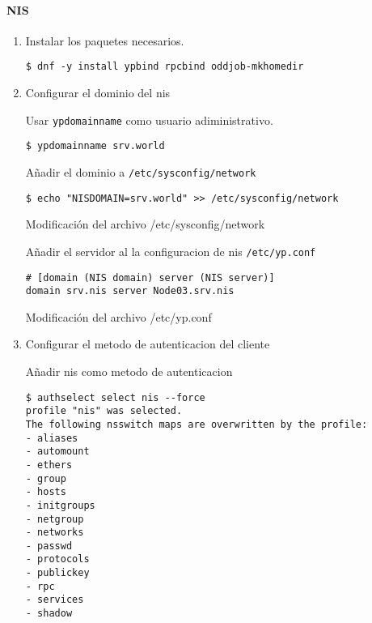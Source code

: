 \documentclass[../main.tex]{subfiles}
\begin{document}
\paragraph{NIS}
\begin{enumerate}
  \item Instalar los paquetes necesarios.
        \begin{listing}[H]
\begin{verbatim}
$ dnf -y install ypbind rpcbind oddjob-mkhomedir
\end{verbatim}
        \end{listing}

  \item Configurar el dominio del \acrshort{nis}

        Usar \texttt{ypdomainname} como usuario adiministrativo.
        \begin{listing}[H]
\begin{verbatim}
$ ypdomainname srv.world
\end{verbatim}
        \end{listing}
        Añadir el dominio a \texttt{/etc/sysconfig/network}
        \begin{listing}[H]
\begin{verbatim}
$ echo "NISDOMAIN=srv.world" >> /etc/sysconfig/network
\end{verbatim}
          \label{list:sysnetwork}
          \caption{Modificación del archivo /etc/sysconfig/network}
        \end{listing}
        Añadir el servidor al la configuracion de \acrshort{nis} \texttt{/etc/yp.conf}
        \begin{listing}[H]
\begin{verbatim}
# [domain (NIS domain) server (NIS server)]
domain srv.nis server Node03.srv.nis
\end{verbatim}
          \label{list:yp}
          \caption{Modificación del archivo /etc/yp.conf}
        \end{listing}

  \item Configurar el metodo de autenticacion del cliente

        Añadir \acrshort{nis} como metodo de autenticacion
        \begin{listing}[H]
\begin{verbatim}
$ authselect select nis --force
profile "nis" was selected.
The following nsswitch maps are overwritten by the profile:
- aliases
- automount
- ethers
- group
- hosts
- initgroups
- netgroup
- networks
- passwd
- protocols
- publickey
- rpc
- services
- shadow


\end{verbatim}
\end{listing}
\end{enumerate}
\end{document}
